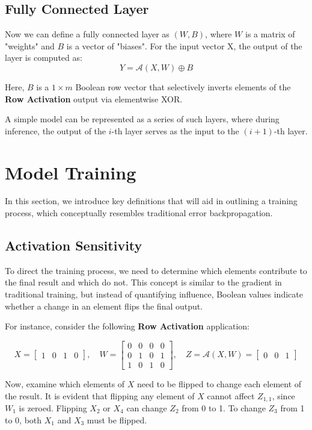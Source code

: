 \documentclass{article}
\theoremstyle{definition}
\begin{document}
\subsection{Fully Connected Layer}
Now we can define a fully connected layer as \( (W, B) \), where \( W \) is a matrix of "weights" and \( B \) is a vector of "biases". For the input vector X, the output of the layer is computed as:
\[ Y = \mathcal{A}(X, W) \oplus B \]

Here, \( B \) is a \( 1 \times m \) Boolean row vector that selectively inverts elements of the \textbf{Row Activation} output via elementwise XOR.

A simple model can be represented as a series of such layers, where during inference, the output of the \( i \)-th layer serves as the input to the \( (i+1) \)-th layer.

\section{Model Training}
In this section, we introduce key definitions that will aid in outlining a training process, which conceptually resembles traditional error backpropagation.

\subsection{Activation Sensitivity}
To direct the training process, we need to determine which elements contribute to the final result and which do not. This concept is similar to the gradient in traditional training, but instead of quantifying influence, Boolean values indicate whether a change in an element flips the final output.

For instance, consider the following \textbf{Row Activation} application:

\[
    X = \begin{bmatrix} 1 & 0 & 1 & 0 \end{bmatrix},\quad
    W = \begin{bmatrix} 0 & 0 & 0 & 0 \\ 0 & 1 & 0 & 1 \\ 1 & 0 & 1 & 0 \end{bmatrix},\quad
    Z = \mathcal{A}\left( X, W \right) = \begin{bmatrix} 0 & 0 & 1 \end{bmatrix}
\]

Now, examine which elements of \( X \) need to be flipped to change each element of the result. It is evident that flipping any element of \( X \) cannot affect \( Z_{1,1} \), since \( W_1 \) is zeroed. Flipping \( X_2 \) or \( X_4 \) can change \( Z_2 \) from 0 to 1. To change \( Z_3 \) from 1 to 0, both \( X_1 \) and \( X_3 \) must be flipped.
\end{document}
